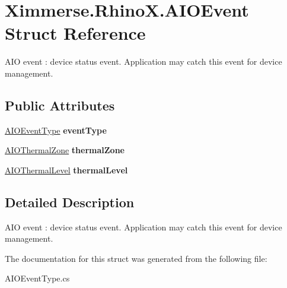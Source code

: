\hypertarget{struct_ximmerse_1_1_rhino_x_1_1_a_i_o_event}{}\section{Ximmerse.\+Rhino\+X.\+A\+I\+O\+Event Struct Reference}
\label{struct_ximmerse_1_1_rhino_x_1_1_a_i_o_event}


A\+IO event \+: device status event. Application may catch this event for device management.  


\subsection*{Public Attributes}
\begin{DoxyCompactItemize}
\item 
\mbox{\label{struct_ximmerse_1_1_rhino_x_1_1_a_i_o_event_af54168c8c21a6278b180ba138076c2f6}} 
\mbox{\hyperlink{namespace_ximmerse_1_1_rhino_x_ab081ae2f0ca6ea05a0a1ab6143ba91a1}{A\+I\+O\+Event\+Type}} {\bfseries event\+Type}
\item 
\mbox{\label{struct_ximmerse_1_1_rhino_x_1_1_a_i_o_event_a16f428c48c8ef0cf798903dd8776ea7a}} 
\mbox{\hyperlink{namespace_ximmerse_1_1_rhino_x_a16299986ba040f9589ccf565ce232d75}{A\+I\+O\+Thermal\+Zone}} {\bfseries thermal\+Zone}
\item 
\mbox{\label{struct_ximmerse_1_1_rhino_x_1_1_a_i_o_event_a77d6188feefb8d6e2b28640cdc0a49cf}} 
\mbox{\hyperlink{namespace_ximmerse_1_1_rhino_x_a5dc681e0c88cfeddf5c073421b71b0a4}{A\+I\+O\+Thermal\+Level}} {\bfseries thermal\+Level}
\end{DoxyCompactItemize}


\subsection{Detailed Description}
A\+IO event \+: device status event. Application may catch this event for device management. 



The documentation for this struct was generated from the following file\+:\begin{DoxyCompactItemize}
\item 
A\+I\+O\+Event\+Type.\+cs\end{DoxyCompactItemize}
